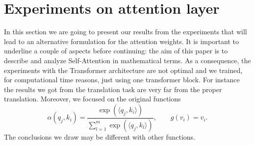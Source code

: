 \documentclass[11pt]{article}
\theoremstyle{plain}
\theoremstyle{remark}
\theoremstyle{definition}
\theoremstyle{plain}
\theoremstyle{plain}
\begin{document}
\section{Experiments on attention layer}
In this section we are going to present our results from the experiments that will lead to an alternative formulation for the attention weights. It is important to underline a couple of aspects before continuing: the aim of this paper is to describe and analyze Self-Attention in mathematical terms. As a consequence, the experiments with the Transformer architecture are not optimal and we trained, for computational time reasons, just using one transformer block. For instance the results we got from the translation task are very far from the proper translation.
Moreover, we focused on the original functions
\[
\alpha(q_j,k_i)=\frac{ \exp(\langle q_j,k_i\rangle)}{\sum_{l=1}^{m} \exp(\langle q_j,k_l\rangle)}, \qquad g(v_i)=v_i.
\]
The conclusions we draw may be different with other functions. 
\end{document}
